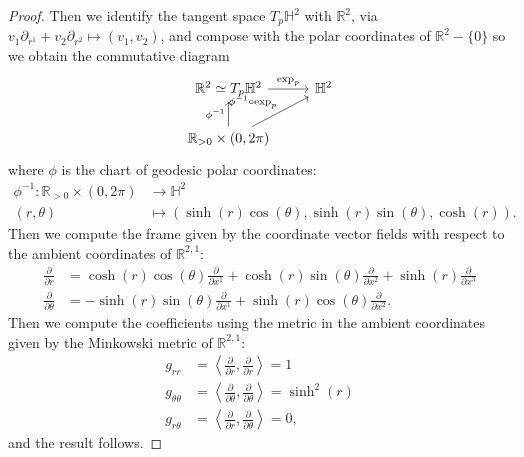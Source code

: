 \documentclass{report}
\begin{document}
\begin{proof}
        Then we identify the tangent space $T_p \mathbb H^2$ with $\mathbb R^2$, via $v_1 \partial_{r^1} + v_2 \partial_{r^2} \mapsto (v_1, v_2)$, and compose with the polar coordinates of $\mathbb R^2 - \{0\}$ so we obtain the commutative diagram
        \[
            \begin{tikzcd}
                \mathbb R^2 \simeq T_p \mathbb H^2  \arrow[r, "\exp_p"] & \mathbb H^2\\
                \mathbb R_{>0} \times (0, 2\pi) \arrow[u, "\phi^{-1}"] \arrow[ur, "\phi^{-1} \circ \exp_p"]
            \end{tikzcd}
        \]
        where $\phi$ is the chart of geodesic polar coordinates:
        \begin{align*}
            \phi^{-1}: \mathbb R_{>0} \times (0, 2\pi) &\to \mathbb H^2\\
            (r, \theta) &\mapsto (\sinh(r) \cos(\theta), \sinh(r) \sin(\theta), \cosh(r)).
        \end{align*}
        Then we compute the frame given by the coordinate vector fields with respect to the ambient coordinates of $\mathbb R^{2,1}$:
        \begin{align*}
            \frac{\partial}{\partial r} &= \cosh(r) \cos(\theta) \frac{\partial}{\partial x^1} + \cosh(r) \sin(\theta) \frac{\partial}{\partial x^2} + \sinh(r) \frac{\partial}{\partial x^3}\\
            \frac{\partial}{\partial \theta} &= -\sinh(r) \sin(\theta) \frac{\partial}{\partial x^1} + \sinh(r) \cos(\theta) \frac{\partial}{\partial x^2}.
        \end{align*}
        Then we compute the coefficients using the metric in the ambient coordinates given by the Minkowski metric of $\mathbb R^{2,1}$:
    \begin{align*}
        g_{rr} &= \left\langle \frac{\partial}{\partial r}, \frac{\partial}{\partial r} \right\rangle = 1\\
        g_{\theta \theta} &= \left\langle \frac{\partial}{\partial \theta}, \frac{\partial}{\partial \theta} \right\rangle = \sinh^2(r)\\
        g_{r \theta} &= \left\langle \frac{\partial}{\partial r}, \frac{\partial}{\partial \theta} \right\rangle = 0,
    \end{align*}
    and the result follows.
    \end{proof}
\end{document}
